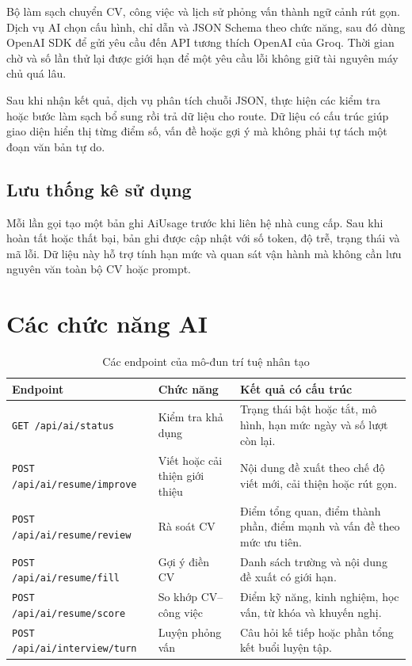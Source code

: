 Bộ làm sạch chuyển CV, công việc và lịch sử phỏng vấn thành ngữ cảnh rút gọn. Dịch vụ AI chọn cấu hình, chỉ dẫn và JSON Schema theo chức năng, sau đó dùng OpenAI SDK để gửi yêu cầu đến API tương thích OpenAI của Groq. Thời gian chờ và số lần thử lại được giới hạn để một yêu cầu lỗi không giữ tài nguyên máy chủ quá lâu.

Sau khi nhận kết quả, dịch vụ phân tích chuỗi JSON, thực hiện các kiểm tra hoặc bước làm sạch bổ sung rồi trả dữ liệu cho route. Dữ liệu có cấu trúc giúp giao diện hiển thị từng điểm số, vấn đề hoặc gợi ý mà không phải tự tách một đoạn văn bản tự do.

\subsection{Lưu thống kê sử dụng}

Mỗi lần gọi tạo một bản ghi AiUsage trước khi liên hệ nhà cung cấp. Sau khi hoàn tất hoặc thất bại, bản ghi được cập nhật với số token, độ trễ, trạng thái và mã lỗi. Dữ liệu này hỗ trợ tính hạn mức và quan sát vận hành mà không cần lưu nguyên văn toàn bộ CV hoặc prompt.

\section{Các chức năng AI}

\begin{table}[H]
    \centering
    \footnotesize
    \begin{tabularx}{\textwidth}{|p{}|p{}|Y|} \hline
        \textbf{Endpoint} & \textbf{Chức năng} & \textbf{Kết quả có cấu trúc} \\ \hline
        \texttt{GET /api/ai/status} & Kiểm tra khả dụng & Trạng thái bật hoặc tắt, mô hình, hạn mức ngày và số lượt còn lại. \\ \hline
        \texttt{POST /api/ai/resume/improve} & Viết hoặc cải thiện giới thiệu & Nội dung đề xuất theo chế độ viết mới, cải thiện hoặc rút gọn. \\ \hline
        \texttt{POST /api/ai/resume/review} & Rà soát CV & Điểm tổng quan, điểm thành phần, điểm mạnh và vấn đề theo mức ưu tiên. \\ \hline
        \texttt{POST /api/ai/resume/fill} & Gợi ý điền CV & Danh sách trường và nội dung đề xuất có giới hạn. \\ \hline
        \texttt{POST /api/ai/resume/score} & So khớp CV--công việc & Điểm kỹ năng, kinh nghiệm, học vấn, từ khóa và khuyến nghị. \\ \hline
        \texttt{POST /api/ai/interview/turn} & Luyện phỏng vấn & Câu hỏi kế tiếp hoặc phần tổng kết buổi luyện tập. \\ \hline
    \end{tabularx}
    \caption{Các endpoint của mô-đun trí tuệ nhân tạo}
    \label{tab:ai-endpoints}
\end{table}

